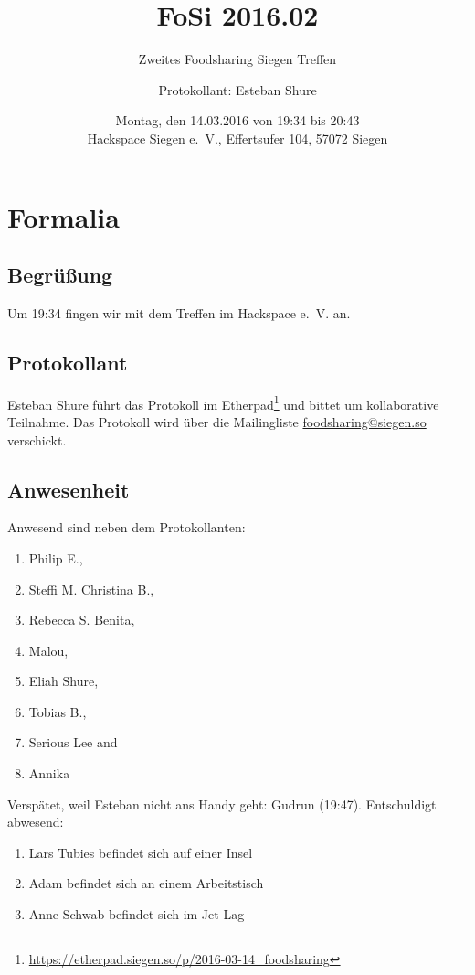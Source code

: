 \documentclass{scrreprt}
\begin{document}
\subject{Protokoll}
\title{FoSi 2016.02}
\subtitle{Zweites Foodsharing Siegen Treffen}
\author{Protokollant: Esteban Shure}
\date{Montag, den 14.03.2016 von 19:34 bis 20:43\\Hackspace Siegen e.~V., Effertsufer 104, 57072 Siegen}
\maketitle
\newpage
\tableofcontents
\newpage

\chapter{Formalia}
\section{Begrüßung}
Um 19:34 fingen wir mit dem Treffen im Hackspace e.~V. an. 
\section{Protokollant}
Esteban Shure führt das Protokoll im Etherpad\footnote{\url{https://etherpad.siegen.so/p/2016-03-14_foodsharing}} und bittet um kollaborative Teilnahme. Das Protokoll wird über die Mailingliste \url{foodsharing@siegen.so} verschickt.
\section{Anwesenheit}
Anwesend sind neben dem Protokollanten: 
\begin{enumerate}
	\item Philip E.,
	\item Steffi M. Christina B.,
	\item Rebecca S. Benita, 
	\item Malou, 
	\item Eliah Shure,
	\item Tobias B.,
	\item Serious Lee and
	\item Annika
\end{enumerate}
Verspätet, weil Esteban nicht ans Handy geht: Gudrun (19:47). Entschuldigt abwesend:
\begin{enumerate}
	\item Lars Tubies befindet sich auf einer Insel
	\item Adam befindet sich an einem Arbeitstisch
	\item Anne Schwab befindet sich im Jet Lag
\end{enumerate}
\end{document}
